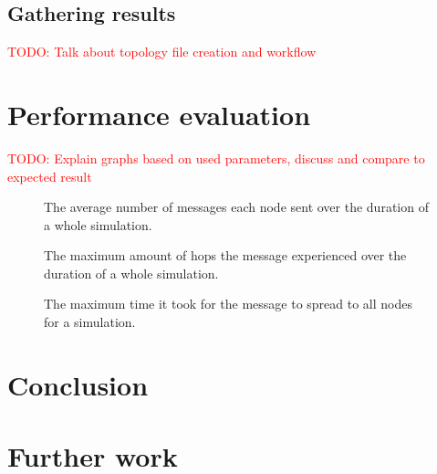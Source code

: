 \documentclass[journal]{IEEEtran}
\begin{document}
\subsection{Gathering results}
\textcolor{red}{TODO: Talk about topology file creation and workflow}

\section{Performance evaluation}
\textcolor{red}{TODO: Explain graphs based on used parameters, discuss and compare to expected result}

%

\begin{figure}
 \centering
 \caption{The average number of messages each node sent over the duration of a whole simulation.}
 \label{fig:avgmsg}
\end{figure}

\begin{figure}
 \centering
 \caption{The maximum amount of hops the message experienced over the duration of a whole simulation.}
 \label{fig:maxhops}
\end{figure}

\begin{figure}
 \centering
 \caption{The maximum time it took for the message to spread to all nodes for a simulation.}
 \label{fig:maxtime}
\end{figure}


\section{Conclusion}


\section{Further work}

\end{document}
